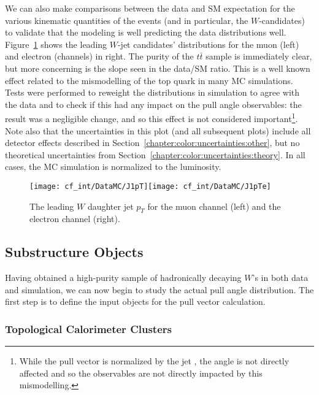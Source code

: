 We can also make comparisons between the data and SM expectation for the various kinematic quantities of the events (and in particular, the $W$-candidates) to validate that the modeling is well predicting the data distributions well. Figure~\ref{fig:color:yields:pts} shows the leading $W$-jet candidates' \pt distributions for the muon (left) and electron (channels) in right. The purity of the $t\bar{t}$ sample is immediately clear, but more concerning is the slope seen in the data/SM ratio. This is a well known effect related to the mismodelling of the top quark \pt in many MC simulations. Tests were performed to reweight the \pt distributions in simulation to agree with the data and to check if this had any impact on the pull angle observables: the result was a negligible change, and so this effect is not considered important\footnote{While the pull vector is normalized by the jet \pt, the angle is not directly affected and so the observables are not directly impacted by this mismodelling.}. Note also that the uncertainties in this plot (and all subsequent plots) include all detector effects described in Section~\ref{chapter:color:uncertainties:other}, but no theoretical uncertainties from Section~\ref{chapter:color:uncertainties:theory}. In all cases, the MC simulation is normalized to the luminosity.


\begin{figure}[h!]
\begin{center}
\texttt{[image: cf\_int/DataMC/J1pT]}\texttt{[image: cf\_int/DataMC/J1pTe]}
 \caption{The leading $W$ daughter jet $p_T$ for the muon channel (left) and the electron channel (right).}
 \label{fig:color:yields:pts}
  \end{center}
\end{figure}



	\subsection{Substructure Objects}

Having obtained a high-purity sample of hadronically decaying $W$'s in both data and simulation, we can now begin to study the actual pull angle distribution. The first step is to define the input objects for the pull vector calculation.

	\subsubsection{Topological Calorimeter Clusters}

